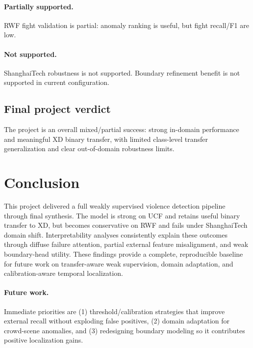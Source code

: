 \documentclass[11pt]{article}
\begin{document}
\paragraph{Partially supported.}
RWF fight validation is partial: anomaly ranking is useful, but fight recall/F1 are low.

\paragraph{Not supported.}
ShanghaiTech robustness is not supported. Boundary refinement benefit is not supported in current configuration.

\subsection{Final project verdict}
The project is an overall mixed/partial success: strong in-domain performance and meaningful XD binary transfer, with limited class-level transfer generalization and clear out-of-domain robustness limits.

\section{Conclusion}
This project delivered a full weakly supervised violence detection pipeline through final synthesis. The model is strong on UCF and retains useful binary transfer to XD, but becomes conservative on RWF and fails under ShanghaiTech domain shift. Interpretability analyses consistently explain these outcomes through diffuse failure attention, partial external feature misalignment, and weak boundary-head utility. These findings provide a complete, reproducible baseline for future work on transfer-aware weak supervision, domain adaptation, and calibration-aware temporal localization.

\paragraph{Future work.}
Immediate priorities are (1) threshold/calibration strategies that improve external recall without exploding false positives, (2) domain adaptation for crowd-scene anomalies, and (3) redesigning boundary modeling so it contributes positive localization gains.



\end{document}
